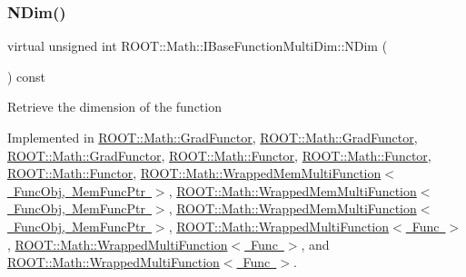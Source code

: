 \subsubsection{\texorpdfstring{NDim()}{NDim()}\hspace{0.1cm}{\footnotesize\ttfamily [2/3]}}
{\footnotesize\ttfamily virtual unsigned int R\+O\+O\+T\+::\+Math\+::\+I\+Base\+Function\+Multi\+Dim\+::\+N\+Dim (\begin{DoxyParamCaption}{ }\end{DoxyParamCaption}) const\hspace{0.3cm}{\ttfamily [pure virtual]}}

Retrieve the dimension of the function 

Implemented in \mbox{\hyperlink{classROOT_1_1Math_1_1GradFunctor_a7ff4ed4ad6f7c17d74403a443990f069}{R\+O\+O\+T\+::\+Math\+::\+Grad\+Functor}}, \mbox{\hyperlink{classROOT_1_1Math_1_1GradFunctor_a7ff4ed4ad6f7c17d74403a443990f069}{R\+O\+O\+T\+::\+Math\+::\+Grad\+Functor}}, \mbox{\hyperlink{classROOT_1_1Math_1_1GradFunctor_a7ff4ed4ad6f7c17d74403a443990f069}{R\+O\+O\+T\+::\+Math\+::\+Grad\+Functor}}, \mbox{\hyperlink{classROOT_1_1Math_1_1Functor_a2544e2ed3c6a0420084c7b08eb3c3130}{R\+O\+O\+T\+::\+Math\+::\+Functor}}, \mbox{\hyperlink{classROOT_1_1Math_1_1Functor_a2544e2ed3c6a0420084c7b08eb3c3130}{R\+O\+O\+T\+::\+Math\+::\+Functor}}, \mbox{\hyperlink{classROOT_1_1Math_1_1Functor_a2544e2ed3c6a0420084c7b08eb3c3130}{R\+O\+O\+T\+::\+Math\+::\+Functor}}, \mbox{\hyperlink{classROOT_1_1Math_1_1WrappedMemMultiFunction_ae9aaf3de1f2e1e6e1c1310fccdb06009}{R\+O\+O\+T\+::\+Math\+::\+Wrapped\+Mem\+Multi\+Function$<$ Func\+Obj, Mem\+Func\+Ptr $>$}}, \mbox{\hyperlink{classROOT_1_1Math_1_1WrappedMemMultiFunction_ae9aaf3de1f2e1e6e1c1310fccdb06009}{R\+O\+O\+T\+::\+Math\+::\+Wrapped\+Mem\+Multi\+Function$<$ Func\+Obj, Mem\+Func\+Ptr $>$}}, \mbox{\hyperlink{classROOT_1_1Math_1_1WrappedMemMultiFunction_ae9aaf3de1f2e1e6e1c1310fccdb06009}{R\+O\+O\+T\+::\+Math\+::\+Wrapped\+Mem\+Multi\+Function$<$ Func\+Obj, Mem\+Func\+Ptr $>$}}, \mbox{\hyperlink{classROOT_1_1Math_1_1WrappedMultiFunction_a99de9f7a6e26b03b1cdcf35d8c62d761}{R\+O\+O\+T\+::\+Math\+::\+Wrapped\+Multi\+Function$<$ Func $>$}}, \mbox{\hyperlink{classROOT_1_1Math_1_1WrappedMultiFunction_a99de9f7a6e26b03b1cdcf35d8c62d761}{R\+O\+O\+T\+::\+Math\+::\+Wrapped\+Multi\+Function$<$ Func $>$}}, and \mbox{\hyperlink{classROOT_1_1Math_1_1WrappedMultiFunction_a99de9f7a6e26b03b1cdcf35d8c62d761}{R\+O\+O\+T\+::\+Math\+::\+Wrapped\+Multi\+Function$<$ Func $>$}}.

\mbox{\label{classROOT_1_1Math_1_1IBaseFunctionMultiDim_a16f37dc7a6d00c75ddeda0697741315d}} 
